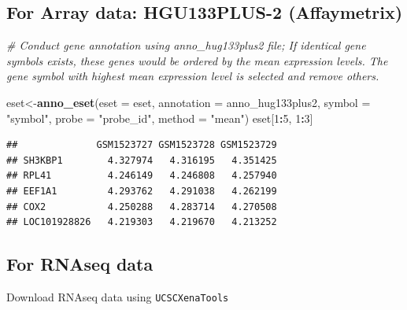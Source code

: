 \documentclass[
  12pt,
]{book}
\newenvironment{Shaded}{\begin{snugshade}}{\end{snugshade}}
\newcommand{\AttributeTok}[1]{\textcolor[rgb]{0.13,0.29,0.53}{#1}}
\newcommand{\CommentTok}[1]{\textcolor[rgb]{0.56,0.35,0.01}{\textit{#1}}}
\newcommand{\DecValTok}[1]{\textcolor[rgb]{0.00,0.00,0.81}{#1}}
\newcommand{\FunctionTok}[1]{\textcolor[rgb]{0.13,0.29,0.53}{\textbf{#1}}}
\newcommand{\NormalTok}[1]{#1}
\newcommand{\OtherTok}[1]{\textcolor[rgb]{0.56,0.35,0.01}{#1}}
\newcommand{\SpecialCharTok}[1]{\textcolor[rgb]{0.81,0.36,0.00}{\textbf{#1}}}
\newcommand{\StringTok}[1]{\textcolor[rgb]{0.31,0.60,0.02}{#1}}
\begin{document}
\hypertarget{for-array-data-hgu133plus-2-affaymetrix}{%
\subsection{For Array data: HGU133PLUS-2 (Affaymetrix)}\label{for-array-data-hgu133plus-2-affaymetrix}}

\begin{Shaded}
\begin{Highlighting}[]
\CommentTok{\# Conduct gene annotation using \textasciigrave{}anno\_hug133plus2\textasciigrave{} file; If identical gene symbols exists, these genes would be ordered by the mean expression levels. The gene symbol with highest mean expression level is selected and remove others. }

\NormalTok{eset}\OtherTok{\textless{}{-}}\FunctionTok{anno\_eset}\NormalTok{(}\AttributeTok{eset       =}\NormalTok{ eset,}
                \AttributeTok{annotation =}\NormalTok{ anno\_hug133plus2,}
                \AttributeTok{symbol     =} \StringTok{"symbol"}\NormalTok{,}
                \AttributeTok{probe      =} \StringTok{"probe\_id"}\NormalTok{,}
                \AttributeTok{method     =} \StringTok{"mean"}\NormalTok{)}
\NormalTok{eset[}\DecValTok{1}\SpecialCharTok{:}\DecValTok{5}\NormalTok{, }\DecValTok{1}\SpecialCharTok{:}\DecValTok{3}\NormalTok{]}
\end{Highlighting}
\end{Shaded}

\begin{verbatim}
##              GSM1523727 GSM1523728 GSM1523729
## SH3KBP1        4.327974   4.316195   4.351425
## RPL41          4.246149   4.246808   4.257940
## EEF1A1         4.293762   4.291038   4.262199
## COX2           4.250288   4.283714   4.270508
## LOC101928826   4.219303   4.219670   4.213252
\end{verbatim}

\hypertarget{for-rnaseq-data}{%
\subsection{For RNAseq data}\label{for-rnaseq-data}}

Download RNAseq data using \texttt{UCSCXenaTools}
\end{document}
